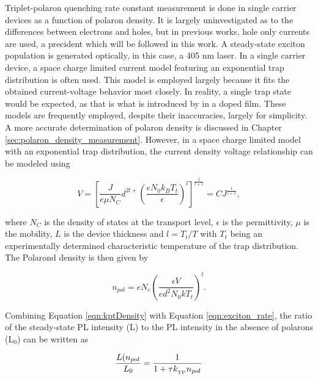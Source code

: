 \documentclass[../thesis.tex]{subfiles}
\begin{document}
Triplet-polaron quenching rate constant measurement is done in single carrier devices as a function of polaron density.  
It is largely uninvestigated as to the differences between electrons and holes, but in previous works, hole only currents are used, a precident which will be followed in this work.\cite{Erickson2014,Reineke2007}
A steady-state exciton population is generated optically, in this case, a 405 nm laser.  
In a single carrier device, a space charge limited current model featuring an exponential trap distribution is often used.\cite{Lampert2002a,Giebink2009a,Pope1999}
This model is employed largely because it fits the obtained current-voltage behavior most closely.  
In reality, a single trap state would be expected, as that is what is introduced by \irppy in a doped film.  
These models are frequently employed, despite their inaccuracies, largely for simplicity.  A more accurate determination of polaron density is discussed in Chapter \ref{sec:polaron_density_measurement}.
However, in a space charge limited model with an exponential trap distribution, the current density voltage relationship can be modeled using

\begin{equation}
V=\left[ \frac{J}{e\mu N_C}d^{2l+}\left( \frac{eN_0k_BT_t}{\epsilon} \right)^l \right]^{\frac{1}{l+1}}=CJ^{\frac{1}{l+1}},
\label{eqn:ktpVoltage}
\end{equation}

where $N_C$ is the density of states at the transport level, $\epsilon$ is the permittivity, $\mu$ is the mobility, $L$ is the device thickness and $l=T_t/T$ with $T_t$ being an experimentally determined characteristic temperature of the trap distribution.  The Polarond density is then given by

\begin{equation}
n_{pol}=eN_c\left(\frac{\epsilon V}{ed^2N_0kT_t}\right)^l.
\label{eqn:kptDensity}
\end{equation}

Combining Equation \ref{eqn:kptDensity} with Equation \ref{eqn:exciton_rate}, the ratio of the steady-state PL intensity (L) to the PL intensity in the absence of polarons (L$_0$) can be written as\cite{Reineke2007}

\begin{equation}
\frac{L(n_{pol}}{L_0}=\frac{1}{1+\tau k_{_\text{\tiny TP}} n_{pol}}
\label{eqn:ktpFit}
\end{equation}
\end{document}
